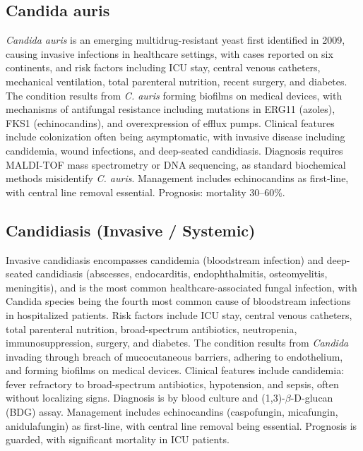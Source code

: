 \subsection{Candida auris}
\label{sec:Candida auris}
\textit{Candida auris} is an emerging multidrug-resistant yeast first identified in 2009, causing invasive infections in healthcare settings, with cases reported on six continents, and risk factors including ICU stay, central venous catheters, mechanical ventilation, total parenteral nutrition, recent surgery, and diabetes. The condition results from \textit{C. auris} forming biofilms on medical devices, with mechanisms of antifungal resistance including mutations in ERG11 (azoles), FKS1 (echinocandins), and overexpression of efflux pumps. Clinical features include colonization often being asymptomatic, with invasive disease including candidemia, wound infections, and deep-seated candidiasis. Diagnosis requires MALDI-TOF mass spectrometry or DNA sequencing, as standard biochemical methods misidentify \textit{C. auris}. Management includes echinocandins as first-line, with central line removal essential. Prognosis: mortality 30--60\%.

\subsection{Candidiasis (Invasive / Systemic)}
\label{sec:Candidiasis Systemic}
Invasive candidiasis encompasses candidemia (bloodstream infection) and deep-seated candidiasis (abscesses, endocarditis, endophthalmitis, osteomyelitis, meningitis), and is the most common healthcare-associated fungal infection, with Candida species being the fourth most common cause of bloodstream infections in hospitalized patients. Risk factors include ICU stay, central venous catheters, total parenteral nutrition, broad-spectrum antibiotics, neutropenia, immunosuppression, surgery, and diabetes. The condition results from \textit{Candida} invading through breach of mucocutaneous barriers, adhering to endothelium, and forming biofilms on medical devices. Clinical features include candidemia: fever refractory to broad-spectrum antibiotics, hypotension, and sepsis, often without localizing signs. Diagnosis is by blood culture and (1,3)-$\beta$-D-glucan (BDG) assay. Management includes echinocandins (caspofungin, micafungin, anidulafungin) as first-line, with central line removal being essential. Prognosis is guarded, with significant mortality in ICU patients.

